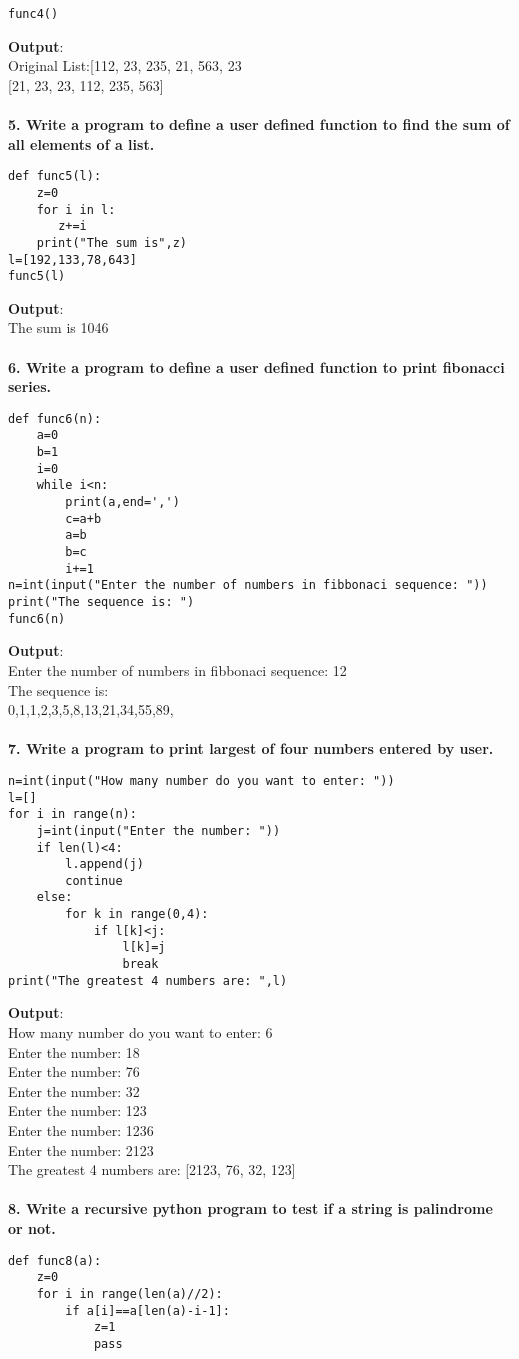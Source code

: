 \documentclass[
a4paper]{article}
\begin{document}
\begin{large}
\begin{verbatim}
func4()
\end{verbatim}
\textbf{Output}:\\
Original List:{[112, 23, 235, 21, 563, 23}\\
{[21, 23, 23, 112, 235, 563]}\\
\\\textbf{5. Write a program to define a user defined function to find the sum of all elements
of a list.}
\begin{verbatim}
def func5(l):
    z=0
    for i in l:
       z+=i
    print("The sum is",z)
l=[192,133,78,643]
func5(l)
\end{verbatim}
\textbf{Output}:\\
The sum is 1046
\\
\\\textbf{6. Write a program to define a user defined function to print fibonacci series.}
\begin{verbatim}
def func6(n):
    a=0
    b=1
    i=0
    while i<n:
        print(a,end=',')
        c=a+b
        a=b
        b=c
        i+=1
n=int(input("Enter the number of numbers in fibbonaci sequence: "))
print("The sequence is: ")
func6(n)
\end{verbatim}
\textbf{Output}:\\
Enter the number of numbers in fibbonaci sequence: 12\\
The sequence is: \\
0,1,1,2,3,5,8,13,21,34,55,89,\\
\\\textbf{7. Write a program to print largest of four numbers entered by user.}
\begin{verbatim}
n=int(input("How many number do you want to enter: "))
l=[]
for i in range(n):
    j=int(input("Enter the number: "))
    if len(l)<4:
        l.append(j)
        continue
    else:
        for k in range(0,4):
            if l[k]<j:
                l[k]=j
                break
print("The greatest 4 numbers are: ",l)
\end{verbatim}
\textbf{Output}:\\
How many number do you want to enter: 6\\
Enter the number: 18\\
Enter the number: 76\\
Enter the number: 32\\
Enter the number: 123\\
Enter the number: 1236\\
Enter the number: 2123\\
The greatest 4 numbers are:  [2123, 76, 32, 123]\\
\\\textbf{8. Write a recursive python program to test if a string is palindrome or not.}
\begin{verbatim}
def func8(a):
    z=0
    for i in range(len(a)//2):
        if a[i]==a[len(a)-i-1]:
            z=1
            pass
            

\end{verbatim}
\end{large}
\end{document}
